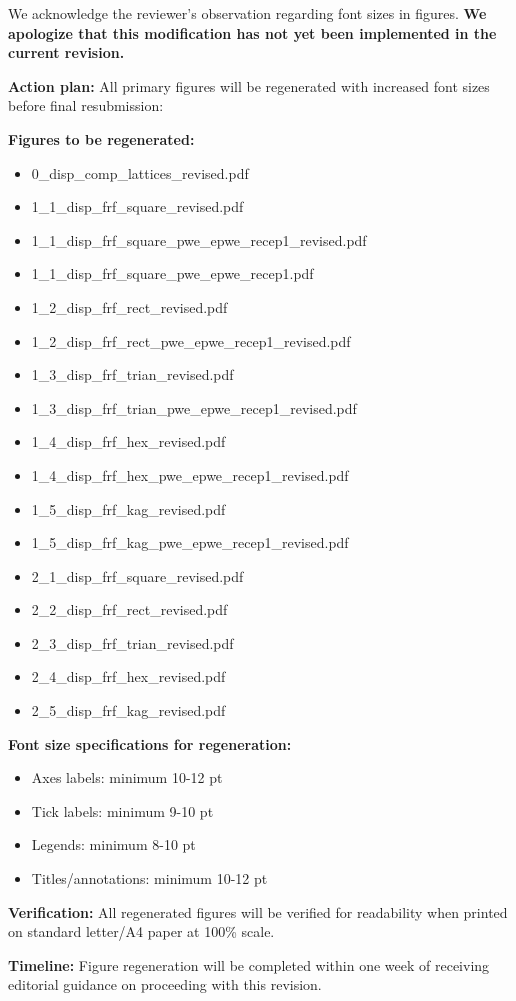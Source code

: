 \documentclass[11pt,a4paper]{article}
\newenvironment{responsebox}{%
    \par\medskip\noindent{\color{responsecolor}\rule{\linewidth}{2pt}}\par
    \noindent{\color{responsecolor}\bfseries Response}\par\smallskip
}{%
    \par\noindent{\color{responsecolor}\rule{\linewidth}{0.5pt}}\medskip
}
\begin{document}
\begin{responsebox}
We acknowledge the reviewer's observation regarding font sizes in figures. \textbf{We apologize that this modification has not yet been implemented in the current revision.}

\textbf{Action plan:} All primary figures will be regenerated with increased font sizes before final resubmission:

\textbf{Figures to be regenerated:}
\begin{itemize}
    \item 0\_disp\_comp\_lattices\_revised.pdf
    \item 1\_1\_disp\_frf\_square\_revised.pdf
    \item 1\_1\_disp\_frf\_square\_pwe\_epwe\_recep1\_revised.pdf
    \item 1\_1\_disp\_frf\_square\_pwe\_epwe\_recep1.pdf
    \item 1\_2\_disp\_frf\_rect\_revised.pdf
    \item 1\_2\_disp\_frf\_rect\_pwe\_epwe\_recep1\_revised.pdf
    \item 1\_3\_disp\_frf\_trian\_revised.pdf
	\item 1\_3\_disp\_frf\_trian\_pwe\_epwe\_recep1\_revised.pdf
	\item 1\_4\_disp\_frf\_hex\_revised.pdf
	\item 1\_4\_disp\_frf\_hex\_pwe\_epwe\_recep1\_revised.pdf
	\item 1\_5\_disp\_frf\_kag\_revised.pdf
	\item 1\_5\_disp\_frf\_kag\_pwe\_epwe\_recep1\_revised.pdf
    \item 2\_1\_disp\_frf\_square\_revised.pdf
	\item 2\_2\_disp\_frf\_rect\_revised.pdf
	\item 2\_3\_disp\_frf\_trian\_revised.pdf
	\item 2\_4\_disp\_frf\_hex\_revised.pdf
	\item 2\_5\_disp\_frf\_kag\_revised.pdf
\end{itemize}

\textbf{Font size specifications for regeneration:}
\begin{itemize}
    \item Axes labels: minimum 10-12 pt
    \item Tick labels: minimum 9-10 pt
    \item Legends: minimum 8-10 pt
    \item Titles/annotations: minimum 10-12 pt
\end{itemize}

\textbf{Verification:} All regenerated figures will be verified for readability when printed on standard letter/A4 paper at 100\% scale.

\textbf{Timeline:} Figure regeneration will be completed within one week of receiving editorial guidance on proceeding with this revision.
\end{responsebox}
\end{document}
